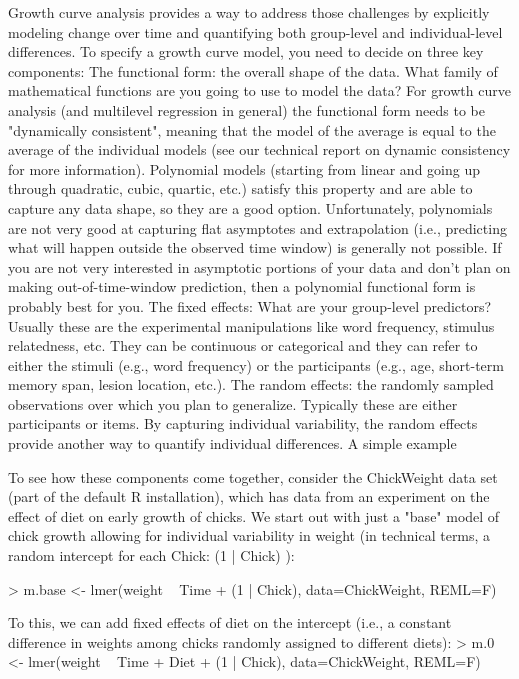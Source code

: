 Growth curve analysis provides a way to address those challenges by explicitly modeling change over time and quantifying both group-level and individual-level differences. To specify a growth curve model, you need to decide on three key components:
The functional form: the overall shape of the data. What family of mathematical functions are you going to use to model the data? For growth curve analysis (and multilevel regression in general) the functional form needs to be "dynamically consistent", meaning that the model of the average is equal to the average of the individual models (see our technical report on dynamic consistency for more information). Polynomial models (starting from linear and going up through quadratic, cubic, quartic, etc.) satisfy this property and are able to capture any data shape, so they are a good option. Unfortunately, polynomials are not very good at capturing flat asymptotes and extrapolation (i.e., predicting what will happen outside the observed time window) is generally not possible. If you are not very interested in asymptotic portions of your data and don't plan on making out-of-time-window prediction, then a polynomial functional form is probably best for you. 
The fixed effects: What are your group-level predictors? Usually these are the experimental manipulations like word frequency, stimulus relatedness, etc. They can be continuous or categorical and they can refer to either the stimuli (e.g., word frequency) or the participants (e.g., age, short-term memory span, lesion location, etc.).
The random effects: the randomly sampled observations over which you plan to generalize. Typically these are either participants or items. By capturing individual variability, the random effects provide another way to quantify individual differences.
A simple example

To see how these components come together, consider the ChickWeight data set (part of the default R installation), which has data from an experiment on the effect of diet on early growth of chicks. We start out with just a "base" model of chick growth allowing for individual variability in weight (in technical terms, a random intercept for each Chick: (1 | Chick) ):

> m.base <- lmer(weight ~ Time + (1 | Chick), data=ChickWeight, REML=F)

To this, we can add fixed effects of diet on the intercept (i.e., a constant difference in weights among chicks randomly assigned to different diets):
> m.0 <- lmer(weight ~ Time + Diet + (1 | Chick), data=ChickWeight, REML=F)

